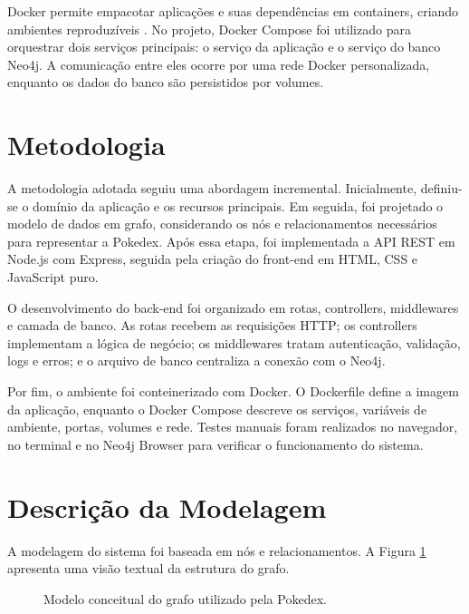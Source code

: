 \documentclass[12pt]{article}
\begin{document}
Docker permite empacotar aplicações e suas dependências em containers, criando ambientes reproduzíveis \cite{dockerDocs}. No projeto, Docker Compose foi utilizado para orquestrar dois serviços principais: o serviço da aplicação e o serviço do banco Neo4j. A comunicação entre eles ocorre por uma rede Docker personalizada, enquanto os dados do banco são persistidos por volumes.

\section{Metodologia}

A metodologia adotada seguiu uma abordagem incremental. Inicialmente, definiu-se o domínio da aplicação e os recursos principais. Em seguida, foi projetado o modelo de dados em grafo, considerando os nós e relacionamentos necessários para representar a Pokedex. Após essa etapa, foi implementada a API REST em Node.js com Express, seguida pela criação do front-end em HTML, CSS e JavaScript puro.

O desenvolvimento do back-end foi organizado em rotas, controllers, middlewares e camada de banco. As rotas recebem as requisições HTTP; os controllers implementam a lógica de negócio; os middlewares tratam autenticação, validação, logs e erros; e o arquivo de banco centraliza a conexão com o Neo4j.

Por fim, o ambiente foi conteinerizado com Docker. O Dockerfile define a imagem da aplicação, enquanto o Docker Compose descreve os serviços, variáveis de ambiente, portas, volumes e rede. Testes manuais foram realizados no navegador, no terminal e no Neo4j Browser para verificar o funcionamento do sistema.

\section{Descrição da Modelagem}

A modelagem do sistema foi baseada em nós e relacionamentos. A Figura \ref{fig:modelagem} apresenta uma visão textual da estrutura do grafo.

\begin{figure}[H]
\centering
{}
\caption{Modelo conceitual do grafo utilizado pela Pokedex.}
\label{fig:modelagem}
\end{figure}
\end{document}
